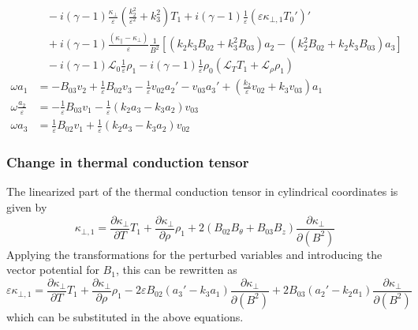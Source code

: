 \documentclass[11pt, fleqn]{article}
\newcommand{\HL}{\mathscr{L}}
\newcommand{\eps}{\varepsilon}
\begin{document}
\begin{equation}
\begin{aligned}
										&~~~~ - i(\gamma - 1)\frac{\kappa_\bot}{\eps}\left(\frac{k_2^2}{\eps^2} + k_3^2\right)T_1 + i(\gamma - 1)\frac{1}{\eps}\left(\eps\kappa_{\bot, 1}T_0'\right)'						\\
										&~~~~ + i(\gamma - 1)\frac{(\kappa_\parallel - \kappa_\bot)}{\eps}\frac{1}{B^2}\left[\left(k_2k_3B_{02} + k_3^2B_{03}\right)a_2 - \left(k_2^2B_{02} + k_2k_3B_{03}\right)a_3\right]	\\
										&~~~~ - i(\gamma - 1)\HL_0\frac{1}{\eps}\rho_1 - i(\gamma - 1)\frac{1}{\eps}\rho_0\left(\HL_T T_1 + \HL_\rho\rho_1\right)															\\[8pt]
		\omega a_1						&= -B_{03}v_2 + \frac{1}{\eps}B_{02}v_3 - \frac{1}{\eps}v_{02}a_2' - v_{03}a_3' + \left(\frac{k_2}{\eps}v_{02} + k_3v_{03}\right)a_1												\\[8pt]
		\omega \frac{a_2}{\eps}			&= -\frac{1}{\eps}B_{03}v_1 - \frac{1}{\eps}\left(k_2a_3 -k_3a_2\right)v_{03}																										\\[8pt]
		\omega a_3						&= \frac{1}{\eps}B_{02}v_1 + \frac{1}{\eps}\left(k_2a_3 - k_3a_2\right)v_{02}																				
	\end{aligned}
\end{equation}

\newpage
\subsubsection{Change in thermal conduction tensor}
The linearized part of the thermal conduction tensor in cylindrical coordinates is given by
\begin{equation}
	\kappa_{\bot, 1} = \frac{\partial \kappa_\bot}{\partial T}T_1 + \frac{\partial \kappa_\bot}{\partial \rho}\rho_1 + 2\left(B_{02}B_\theta + B_{03}B_z\right)\frac{\partial \kappa_\bot}{\partial(B^2)}
\end{equation}
Applying the transformations for the perturbed variables and introducing the vector potential for $B_1$, this can be rewritten as
\begin{equation}
	\eps\kappa_{\bot, 1} = \frac{\partial \kappa_\bot}{\partial T}T_1 + \frac{\partial \kappa_\bot}{\partial \rho}\rho_1 - 2\eps B_{02}\left(a_3' - k_3a_1\right)\frac{\partial \kappa_\bot}{\partial (B^2)}
											+ 2B_{03}\left(a_2' - k_2a_1\right)\frac{\partial \kappa_\bot}{\partial (B^2)}
\end{equation}
which can be substituted in the above equations.
\end{document}
